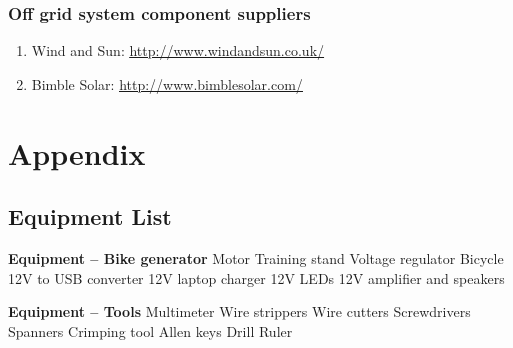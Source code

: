 \documentclass{article}
\theoremstyle{definition}
\theoremstyle{definition}
\theoremstyle{remark}
\begin{document}

  \subsubsection{Off grid system component suppliers} %
  \label{ssub:off_grid_system_component_suppliers}

    \begin{enumerate}[resume]
      \item Wind and Sun: \href{http://www.windandsun.co.uk/}{\underline{http://www.windandsun.co.uk/}}
      \item Bimble Solar: \href{http://www.bimblesolar.com/}{\underline{http://www.bimblesolar.com/}}
    \end{enumerate}
  


\newpage

{\color{blue}\section{Appendix}} %
\label{sec:appendix}

  {\color{blue}\subsection{Equipment List}} %
  \label{sub:equipment_list}

    \textbf{Equipment – Bike generator}
    Motor \newline
    Training stand \newline
    Voltage regulator \newline
    Bicycle \newline
    12V to USB converter \newline
    12V laptop charger \newline
    12V LEDs \newline
    12V amplifier and speakers

    \textbf{Equipment – Tools} \newline
    Multimeter \newline
    Wire strippers \newline
    Wire cutters \newline
    Screwdrivers \newline
    Spanners \newline
    Crimping tool \newline
    Allen keys \newline
    Drill \newline
    Ruler
\end{document}
